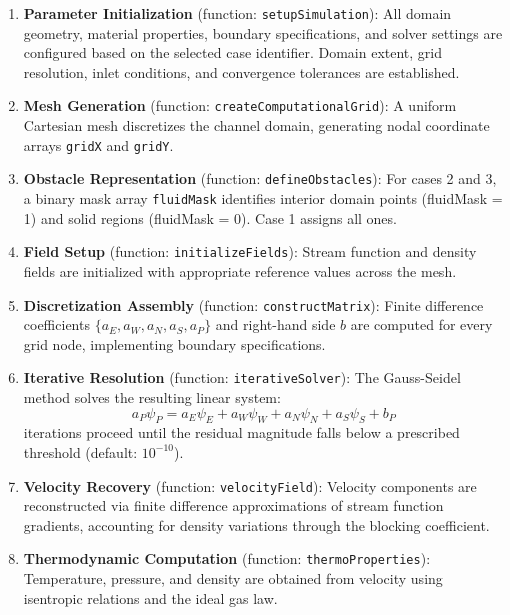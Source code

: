 \begin{enumerate}
    \item \textbf{Parameter Initialization} (function: \texttt{setupSimulation}): All domain geometry, material properties, boundary specifications, and solver settings are configured based on the selected case identifier. Domain extent, grid resolution, inlet conditions, and convergence tolerances are established.

    \item \textbf{Mesh Generation} (function: \texttt{createComputationalGrid}): A uniform Cartesian mesh discretizes the channel domain, generating nodal coordinate arrays \texttt{gridX} and \texttt{gridY}.

    \item \textbf{Obstacle Representation} (function: \texttt{defineObstacles}): For cases 2 and 3, a binary mask array \texttt{fluidMask} identifies interior domain points (fluidMask = 1) and solid regions (fluidMask = 0). Case 1 assigns all ones.
    
    \item \textbf{Field Setup} (function: \texttt{initializeFields}): Stream function and density fields are initialized with appropriate reference values across the mesh.

    \item \textbf{Discretization Assembly} (function: \texttt{constructMatrix}): Finite difference coefficients $\{a_E, a_W, a_N, a_S, a_P\}$ and right-hand side $b$ are computed for every grid node, implementing boundary specifications.
    
    \item \textbf{Iterative Resolution} (function: \texttt{iterativeSolver}): The Gauss-Seidel method solves the resulting linear system:
    \begin{equation}
        a_P \psi_P = a_E \psi_E + a_W \psi_W + a_N \psi_N + a_S \psi_S + b_P
    \end{equation}
    iterations proceed until the residual magnitude falls below a prescribed threshold (default: $10^{-10}$).
    
    \item \textbf{Velocity Recovery} (function: \texttt{velocityField}): Velocity components are reconstructed via finite difference approximations of stream function gradients, accounting for density variations through the blocking coefficient.
    
    \item \textbf{Thermodynamic Computation} (function: \texttt{thermoProperties}): Temperature, pressure, and density are obtained from velocity using isentropic relations and the ideal gas law.


\end{enumerate}
